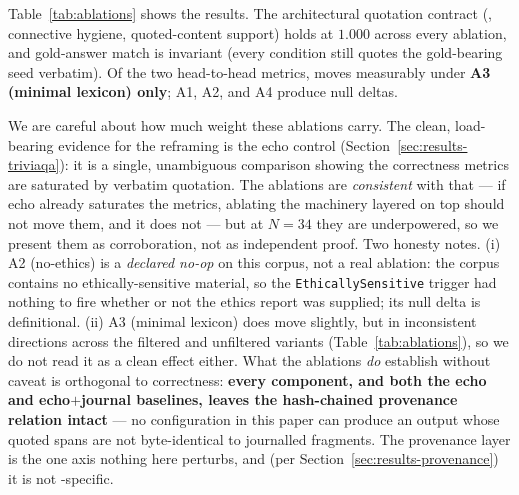 Table~\ref{tab:ablations} shows the results. The architectural
quotation contract (\verbpass{}, connective hygiene,
quoted-content support) holds at $1.000$ across every ablation,
and gold-answer match is invariant (every condition still quotes
the gold-bearing seed verbatim). Of the two head-to-head metrics,
\unsupf{} moves measurably under \textbf{A3 (minimal lexicon)
only}; A1, A2, and A4 produce null deltas.

We are careful about how much weight these ablations carry. The
clean, load-bearing evidence for the reframing is the echo control
(Section~\ref{sec:results-triviaqa}): it is a single,
unambiguous comparison showing the correctness metrics are
saturated by verbatim quotation. The ablations are
\emph{consistent} with that --- if echo already saturates the
metrics, ablating the machinery layered on top should not move
them, and it does not --- but at $N=34$ they are underpowered, so
we present them as corroboration, not as independent proof. Two
honesty notes. (i) A2 (no-ethics) is a \emph{declared no-op} on
this corpus, not a real ablation: the corpus contains no
ethically-sensitive material, so the \texttt{EthicallySensitive}
trigger had nothing to fire whether or not the ethics report was
supplied; its null delta is definitional. (ii) A3 (minimal
lexicon) does move \unsupf{} slightly, but in inconsistent
directions across the filtered and unfiltered variants
(Table~\ref{tab:ablations}), so we do not read it as a clean
effect either. What the ablations \emph{do} establish without
caveat is orthogonal to correctness: \textbf{every component, and
both the echo and echo$+$journal baselines, leaves the hash-chained
provenance relation intact} --- no configuration in this paper can
produce an output whose quoted spans are not byte-identical to
journalled fragments. The provenance layer is the one axis nothing
here perturbs, and (per Section~\ref{sec:results-provenance}) it is
not \hyphae{}-specific.

